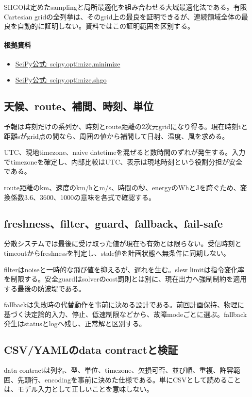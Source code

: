 \documentclass[a4paper,11pt]{article}
\begin{document}
SHGOは定めたsamplingと局所最適化を組み合わせる大域最適化法である。有限Cartesian gridの全列挙は、そのgrid上の最良を証明できるが、連続領域全体の最良を自動的に証明しない。資料ではこの証明範囲を区別する。

\paragraph{根拠資料}
\begin{itemize}[leftmargin=1.6em]
\item \href{https://docs.scipy.org/doc/scipy/reference/generated/scipy.optimize.minimize.html}{SciPy公式: scipy.optimize.minimize}
\item \href{https://docs.scipy.org/doc/scipy/reference/generated/scipy.optimize.shgo.html}{SciPy公式: scipy.optimize.shgo}
\end{itemize}

\subsection{天候、route、補間、時刻、単位}
予報は時刻だけの系列か、時刻とroute距離の2次元gridになり得る。現在時刻tと距離sがgrid点の間なら、周囲の値から補間して日射、温度、風を求める。


UTC、現地timezone、naive datetimeを混ぜると数時間のずれが発生する。入力でtimezoneを確定し、内部比較はUTC、表示は現地時刻という役割分担が安全である。


route距離のkm、速度のkm/hとm/s、時間の秒、energyのWhとJを跨ぐため、変換係数3.6、3600、1000の意味を各式で確認する。



\subsection{freshness、filter、guard、fallback、fail-safe}
分散システムでは最後に受け取った値が現在も有効とは限らない。受信時刻とtimeoutからfreshnessを判定し、stale値を計画状態へ無条件に同期しない。


filterはnoiseと一時的な飛び値を抑えるが、遅れを生む。slew limitは指令変化率を制限する。安全guardはsolverのcost罰則とは別に、現在出力へ強制制約を適用する最後の防波堤である。


fallbackは失敗時の代替動作を事前に決める設計である。前回計画保持、物理に基づく決定論的入力、停止、低速制限などから、故障modeごとに選ぶ。fallback発生はstatusとlogへ残し、正常解と区別する。



\subsection{CSV/YAMLのdata contractと検証}
data contractは列名、型、単位、timezone、欠損可否、並び順、重複、許容範囲、先頭行、encodingを事前に決めた仕様である。単にCSVとして読めることは、モデル入力として正しいことを意味しない。
\end{document}
